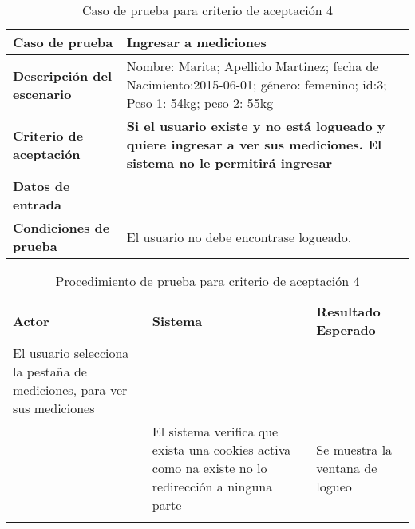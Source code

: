 		{\scriptsize
    \begin{table} [h]
    \centering
	\begin{tabular}{|m{3cm}|m{10cm}||}
    	\rowcolor[gray]{0.9}
	    \hline
		\textbf{Caso de prueba} & \textbf{Ingresar a mediciones} \\  \hline
	    \textbf{Descripción del escenario}& Nombre: Marita; Apellido Martinez; fecha de Nacimiento:2015-06-01; género: femenino; id:3; Peso 1: 54kg; peso 2: 55kg\\ \hline
	    \textbf{Criterio de aceptación}&\textbf{Si el usuario existe y no está logueado y quiere ingresar a ver sus mediciones. El sistema no le permitirá ingresar}\\ \hline
        \textbf{Datos de entrada}&  \\ \hline
        \textbf{Condiciones de  prueba}& El usuario no debe encontrase logueado.\\ \hline
	    \end{tabular}
        \caption{Caso de prueba para criterio de aceptación 4}
    	\end{table}
		}
	

	\begin{longtable}{|m{4cm}|p{5cm}|m{4cm}|}
	    \hline \rowcolor[gray]{0.9}
        \multicolumn{3}{|c|}{\textbf{Procedimiento de Prueba -Ingresar mediciones}} \\ \hline
	    \textbf{Actor} & \textbf{Sistema}&\textbf{Resultado Esperado} \\  \hline
	   El usuario selecciona la pestaña de mediciones, para ver sus mediciones & & \\ \hline
        & El sistema  verifica que exista una cookies activa como na existe no lo redirección a ninguna parte &  Se muestra la ventana de logueo \\ \hline
   \caption{Procedimiento de prueba para criterio de aceptación 4}        
    \end{longtable}
 


